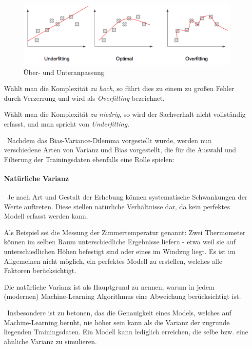 \begin{figure}[h]
	\begin{center}
		\includegraphics[width=0.6\linewidth]{Bilder/Overfitting}
		\caption[Über- und Unteranpassung: \url{
			https://pythonmachinelearning.pro/a-guide-to-improving-deep-learnings-performance/}]{Über- und Unteranpassung}
		\label{fig:Overfitting}
	\end{center}
\end{figure}

Wählt man die Komplexität \textit{zu hoch}, so führt dies zu einem zu großen Fehler durch Verzerrung und wird als \textit{Overfitting} bezeichnet. 

Wählt man die Komplexität \textit{zu niedrig}, so wird der Sachverhalt nicht vollständig erfasst, und man spricht von \textit{Underfitting}.

~\newline Nachdem das Bias-Variance-Dilemma vorgestellt wurde, werden nun verschiedene Arten von Varianz und Bias vorgestellt, die für die Auswahl und Filterung der Trainingsdaten ebenfalls eine Rolle spielen:
\paragraph{Natürliche Varianz} ~\newline Je nach Art und Gestalt der Erhebung können systematische Schwankungen der Werte auftreten. Diese stellen natürliche Verhältnisse dar, da kein perfektes Modell erfasst werden kann. 

Als Beispiel sei die Messung der Zimmertemperatur genannt: Zwei Thermometer können im selben Raum unterschiedliche Ergebnisse liefern - etwa weil sie auf unterschiedlichen Höhen befestigt sind oder eines im Windzug liegt. Es ist im Allgemeinen nicht möglich, ein perfektes Modell zu erstellen, welches alle Faktoren berücksichtigt.

Die natürliche Varianz ist als Hauptgrund zu nennen, warum in jedem (modernen) Machine-Learning Algorithmus eine Abweichung berücksichtigt ist.

~\newline Insbesondere ist  zu betonen, das die Genauigkeit eines Models, welches auf Machine-Learning beruht, nie höher sein kann als die Varianz der zugrunde liegenden Trainingsdaten. Ein Modell kann lediglich erreichen, die selbe bzw. eine ähnliche Varianz zu simulieren.

